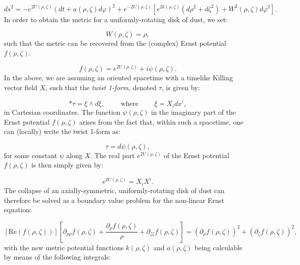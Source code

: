 \documentclass{article}
\begin{document}
\begin{equation}
d s^2 = - e^{2 U \left( \rho, \zeta \right)} \left( d t + a \left( \rho, \zeta \right) d \varphi \right)^2 + e^{-2 U \left( \rho, \zeta \right)} \left[ e^{2 k \left( \rho, \zeta \right)} \left( d \rho^2 + d \zeta^2 \right) + W^2 \left( \rho, \zeta \right) d \varphi^2 \right].
\end{equation}
In order to obtain the metric for a uniformly-rotating disk of dust, we set:

\begin{equation}
W \left( \rho, \zeta \right) = \rho,
\end{equation}
such that the metric can be recovered from the (complex) Ernst potential ${f \left( \rho, \zeta \right)}$:

\begin{equation}
f \left( \rho, \zeta \right) = e^{2 U \left( \rho, \zeta \right)} + i \psi \left( \rho, \zeta \right).
\end{equation}
In the above, we are assuming an oriented spacetime with a timelike Killing vector field $X$, such that the \textit{twist 1-form}, denoted ${\tau}$, is given by:

\begin{equation}
* \tau = \xi \wedge d \xi, \qquad \text{ where } \qquad \xi = X_i d x^i,
\end{equation}
in Cartesian coordinates. The function ${\psi \left( \rho, \zeta \right)}$ in the imaginary part of the Ernst potential ${f \left( \rho, \zeta \right)}$ arises from the fact that, within such a spacetime, one can (locally) write the twist 1-form as:

\begin{equation}
\tau = d \psi \left( \rho, \zeta \right),
\end{equation}
for some constant ${\psi}$ along $X$. The real part ${e^{2 U \left( \rho, \zeta \right)}}$ of the Ernst potential ${f \left( \rho, \zeta \right)}$ is then simply given by:

\begin{equation}
e^{2 U \left( \rho, \zeta \right)} = X_i X^i.
\end{equation}
The collapse of an axially-symmetric, uniformly-rotating disk of dust can therefore be solved as a boundary value problem for the non-linear Ernst equation:

\begin{equation}
\left[ \mathrm{Re} \left( f \left( \rho, \zeta \right) \right) \right] \left[ \partial_{\rho \rho} f \left( \rho, \zeta \right) + \frac{\partial_{\rho} f \left( \rho, \zeta \right)}{\rho} + \partial_{\zeta \zeta} f \left( \rho, \zeta \right) \right] = \left( \partial_{\rho} f \left( \rho, \zeta \right) \right)^2 + \left( \partial_{\zeta} f \left( \rho, \zeta \right) \right)^2,
\end{equation}
with the new metric potential functions ${k \left( \rho, \zeta \right)}$ and ${a \left( \rho, \zeta \right)}$ being calculable by means of the following integrals:
\end{document}

